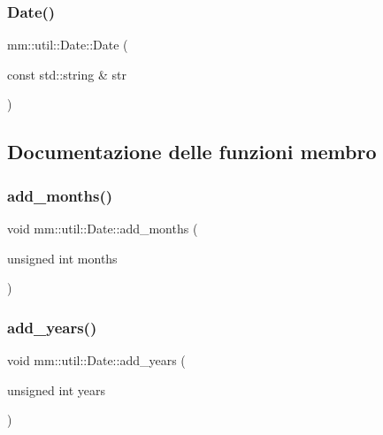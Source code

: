 \mbox{\label{structmm_1_1util_1_1_date_a9065cbdea26e95cfbb6537a5ba06f45d}} 
\subsubsection{\texorpdfstring{Date()}{Date()}\hspace{0.1cm}{\footnotesize\ttfamily [3/3]}}
{\footnotesize\ttfamily mm\+::util\+::\+Date\+::\+Date (\begin{DoxyParamCaption}\item[{const std\+::string \&}]{str }\end{DoxyParamCaption})}



\subsection{Documentazione delle funzioni membro}
\mbox{\label{structmm_1_1util_1_1_date_ae875de5d40ab9dfa1f1e22cb8a847b60}} 
\subsubsection{\texorpdfstring{add\+\_\+months()}{add\_months()}}
{\footnotesize\ttfamily void mm\+::util\+::\+Date\+::add\+\_\+months (\begin{DoxyParamCaption}\item[{unsigned int}]{months }\end{DoxyParamCaption})}

\mbox{\label{structmm_1_1util_1_1_date_a5ca08a73148a58f47847a30040eee70b}} 
\subsubsection{\texorpdfstring{add\+\_\+years()}{add\_years()}}
{\footnotesize\ttfamily void mm\+::util\+::\+Date\+::add\+\_\+years (\begin{DoxyParamCaption}\item[{unsigned int}]{years }\end{DoxyParamCaption})}

